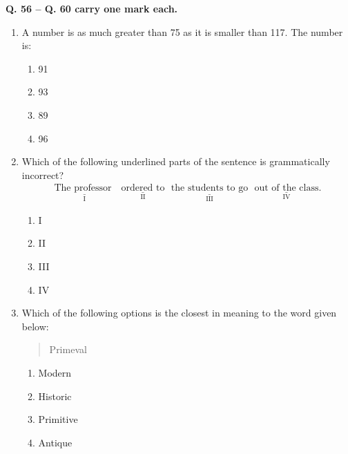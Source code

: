 \documentclass[14pt, a4paper]{extarticle}
\begin{document}
\begin{enumerate}[label=\textbf{Q. \arabic*}]
\textbf{Q. 56 -- Q. 60 carry one mark each.}

\begin{enumerate}[label=\textbf{Q.\arabic*}, start=56]

\item A number is as much greater than 75 as it is smaller than 117. The number is:
    \begin{multicols}{4}
        \begin{enumerate}
            \item 91
            \item 93
            \item 89
            \item 96
        \end{enumerate}
    \end{multicols}

\item Which of the following underlined parts of the sentence is grammatically incorrect?
\begin{align*}
\underset{\text{I}} {\underline{\text{The professor }}}\text{ } \underset{\text{II}}{\underline{\text{ordered to}}}\text{ } \underset{\text{III}}{\underline{\text{the students to go}}}\text{ } \underset{\text{IV}}{\underline{\text{out of the class}}}.
\end{align*}
    \begin{multicols}{4}
        \begin{enumerate}
            \item I
            \item II
            \item III
            \item IV
        \end{enumerate}
    \end{multicols}

\item Which of the following options is the closest in meaning to the word given below:
\begin{quote}
        Primeval
\end{quote}
    \begin{multicols}{2}
        \begin{enumerate}
            \item Modern
            \item Historic
            \item Primitive
            \item Antique
        \end{enumerate}
    \end{multicols}


\end{enumerate}
\end{enumerate}
\end{document}
